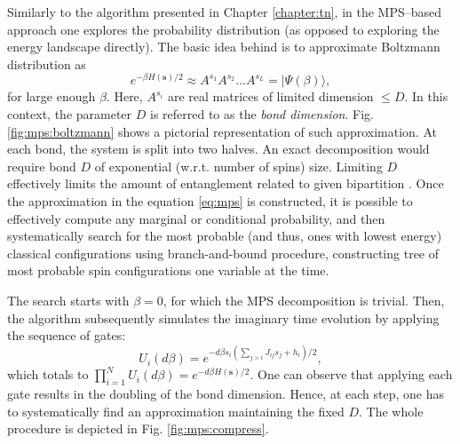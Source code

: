 Similarly to the algorithm presented in Chapter \ref{chapter:tn}, in the
MPS--based approach one explores the probability distribution (as opposed to
exploring the energy landscape directly). The basic idea behind is to
approximate Boltzmann distribution as
\begin{equation}
  e^{-\beta H(\mathbf{s})/2} \approx A^{s_1} A^{s_2} \ldots A^{s_L} = |\Psi(\beta) \rangle,
  \label{eq:mps}
\end{equation}
for large enough $\beta$. Here, $A^{s_{i}}$ are real matrices of limited
    dimension $\le D$. In this context, the parameter $D$ is referred to as the
\emph{bond dimension}. Fig. \ref{fig:mps:boltzmann} shows a pictorial
representation of such approximation. At each bond, the system is split into
two halves. An exact decomposition would require bond $D$ of exponential
(w.r.t. number of spins) size. Limiting $D$ effectively limits the amount of
entanglement related to given bipartition \cite{Wall18}. Once the approximation
in the equation \eqref{eq:mps} is constructed, it is possible to effectively
compute any marginal or conditional probability, and then systematically search
for the most probable (and thus, ones with lowest energy) classical
configurations using branch-and-bound procedure, constructing tree of most
probable spin configurations one variable at the time.

The search starts with $\beta=0$, for which the MPS decomposition is trivial.
Then, the algorithm subsequently simulates the imaginary time evolution by
applying the sequence of gates:
\begin{equation}
  \label{eq:gate}
  U_i(d\beta) = e^{-d\beta s_i (\sum_{j>i}J_{ij}  s_j+h_i)/2},
\end{equation}
which totals to $\prod_{i=1}^N U_i(d\beta) = e^{-d \beta H(\mathbf{s})/2}$. One
    can observe that applying each gate results in the doubling of the bond
    dimension. Hence, at each step, one has to systematically find an approximation
    maintaining the fixed $D$. The whole procedure is depicted in Fig.
\ref{fig:mps:compress}.

